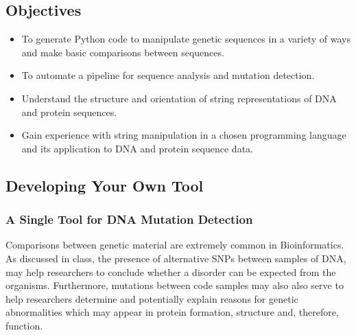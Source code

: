 

\long{}



\vspace*{-.1in}
\subsection*{Objectives}
\vspace*{-.1in}

\begin{itemize}
	\item To generate Python code to manipulate genetic sequences in a variety of ways and make basic comparisons between sequences.
	\item To automate a pipeline for sequence analysis and mutation detection.
	\item Understand the structure and orientation of string representations of DNA and protein sequences.
	\item Gain experience with string manipulation in a chosen programming language and its application to DNA and protein sequence data.
\end{itemize}


\vspace*{-.1in}
\subsection*{Developing Your Own Tool}
\vspace*{-.1in} 

	\subsubsection*{A Single Tool for DNA Mutation Detection}
Comparisons between genetic material are extremely common in Bioinformatics. As discussed in class, the presence of alternative SNPs between samples of DNA, may help researchers to conclude whether a disorder can be expected from the organisms. Furthermore, mutations between code samples may also also serve to help researchers determine and potentially explain reasons for genetic abnormalities which may appear in protein formation, structure and, therefore, function. 

